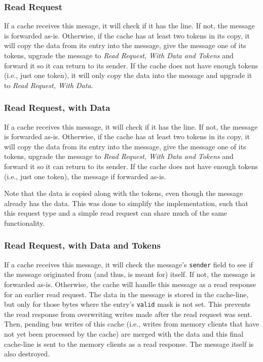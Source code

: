 \subsubsection{Read Request}
If a cache receives this mesage, it will check if it has the line. If not, the message is forwarded as-is. Otherwise, if the cache has at least two tokens in its copy, it will copy the data from its entry into the message, give the message one of its tokens, upgrade the message to \emph{Read Request, With Data and Tokens} and forward it so it can return to its sender. If the cache does not have enough tokens (i.e., just one token), it will only copy the data into the message and upgrade it to \emph{Read Request, With Data}.

\subsubsection{Read Request, with Data}
If a cache receives this message, it will check if it has the line. If not, the message is forwarded as-is. Otherwise, if the cache has at least two tokens in its copy, it will copy the data from its entry into the message, give the message one of its tokens, upgrade the message to \emph{Read Request, With Data and Tokens} and forward it so it can return to its sender. If the cache does not have enough tokens (i.e., just one token), the message if forwarded as-is.

Note that the data is copied along with the tokens, even though the message already has the data. This was done to simplify the implementation, such that this request type and a simple read request can share much of the same functionality.

\subsubsection{Read Request, with Data and Tokens}
If a cache receives this message, it will check the message's {\tt sender} field to see if the message originated from (and thus, is meant for) itself. If not, the message is forwarded as-is. Otherwise, the cache will handle this message as a read response for an earlier read request. The data in the message is stored in the cache-line, but only for those bytes where the entry's {\tt valid} mask is not set. This prevents the read response from overwriting writes made after the read request was sent. Then, pending bus writes of this cache (i.e., writes from memory clients that have not yet been processed by the cache) are merged with the data and this final cache-line is sent to the memory clients as a read response. The message itself is also destroyed.


